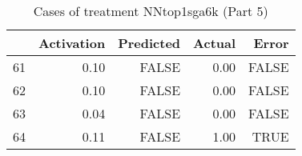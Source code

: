 \begin{table}[ht]
\centering
\begin{tabular}{rrrrr}
  \hline
 & Activation & Predicted & Actual & Error \\ 
  \hline
61 & 0.10 & FALSE & 0.00 & FALSE \\ 
  62 & 0.10 & FALSE & 0.00 & FALSE \\ 
  63 & 0.04 & FALSE & 0.00 & FALSE \\ 
  64 & 0.11 & FALSE & 1.00 & TRUE \\ 
   \hline
\end{tabular}
\caption{Cases of treatment NNtop1sga6k (Part 5)} 
\end{table}
